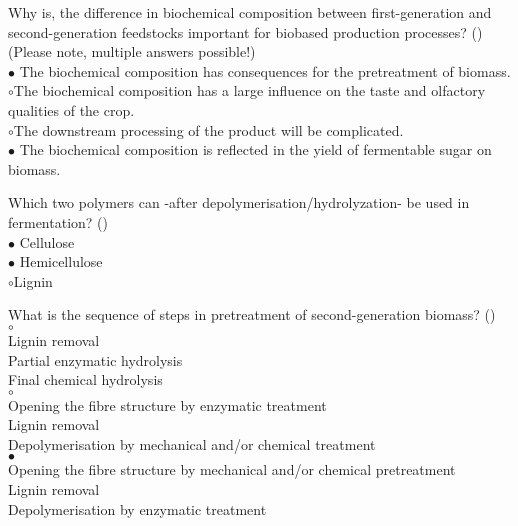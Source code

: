 \documentclass[]{beamer}
\begin{document}
\begin{CJK}{UTF8}{gbsn}
\begin{frame}[shrink] {} 
\addtocounter{questions}{1}
\color{blue}
Why is, the difference in biochemical composition between first-generation and second-generation feedstocks important for biobased production processes?
 ({})\\
(Please note, multiple answers possible!)
  \\
\color{black}
\setlength{\parindent}{-0.4cm}
{\color{red}$\bullet$} The biochemical composition has consequences for the pretreatment  of biomass.  \\
{\color{red}$\circ$}The biochemical composition has a large influence on the taste and olfactory qualities of the crop.  \\
{\color{red}$\circ$}The downstream processing of the product will be complicated.  \\
{\color{red}$\bullet$} The biochemical composition is reflected in the yield of fermentable sugar on biomass.  \\
\end{frame}


\begin{frame}[shrink] {} 
\addtocounter{questions}{1}
\color{blue}
  Which two polymers can -after depolymerisation/hydrolyzation- be used in fermentation? 
 ({})\\
\color{black}
\setlength{\parindent}{-0.4cm}
{\color{red}$\bullet$} Cellulose  \\
{\color{red}$\bullet$} Hemicellulose  \\
{\color{red}$\circ$}Lignin  \\
\end{frame}


\begin{frame}[shrink] {} 
\addtocounter{questions}{1}
\color{blue}
  What is the sequence of steps in pretreatment of second-generation biomass? 
 ({})\\
\color{black}
\setlength{\parindent}{-0.4cm}
{\color{red}$\circ$}   \\
Lignin removal\\
Partial enzymatic hydrolysis\\
Final chemical hydrolysis\\
{\color{red}$\circ$}   \\
Opening the fibre structure by enzymatic treatment \\
Lignin removal\\
Depolymerisation by mechanical and/or chemical treatment\\
{\color{red}$\bullet$}   \\
Opening the fibre structure by mechanical and/or chemical pretreatment\\
Lignin removal\\
Depolymerisation by enzymatic treatment\\
\end{frame}


\end{CJK}
\end{document}
